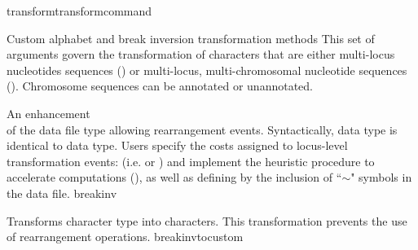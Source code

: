 \begin{command}{transform}{transformcommand}
\begin{arguments}

        \begin{argumentgroup}
            {Custom alphabet and break inversion transformation methods}   
            This set of arguments govern the transformation of characters that are either multi-locus nucleotides 
            sequences () or multi-locus, multi-chromosomal nucleotide
            sequences ().  Chromosome sequences can be \poyargument
            {annotated} or unannotated.

                {An enhancement \\ of the data file type  allowing
                rearrangement events. Syntactically,  data type is identical to 
                 data type. Users specify 
                the costs assigned to locus-level transformation events: (i.e. 
                 or  ) 
                and implement the heuristic  procedure to accelerate computations 
                (), as well as defining  by the 
                inclusion of ``$\sim$" symbols in the data file.} 
                {breakinv}
            
                {Transforms  character type into  characters.
                This transformation prevents the use of rearrangement operations.}
                {breakinvtocustom}

            

\end{argumentgroup}
\end{arguments}
\end{command}
